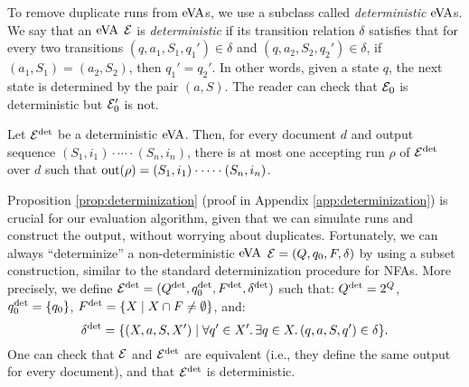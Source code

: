 To remove duplicate runs from $\mathrm{eVA}$s, we use a subclass called
\emph{deterministic} $\mathrm{eVA}$s. We say that an $\mathrm{eVA}$ $\mathcal{E}$ is
\emph{deterministic} if its transition relation $\delta$ satisfies that for
every two transitions $(q, a_1, S_1, q_1') \in \delta$ and $(q, a_2, S_2, q_2')
\in \delta$, if $(a_1, S_1) = (a_2, S_2)$, then $q_1' = q_2'$. In other words,
given a state $q$, the next state is determined by the pair $(a, S)$. The reader
can check that $\mathcal{E}_0$ is deterministic but $\mathcal{E}_0'$ is not. 
\begin{proposition} \label{prop:determinization} Let $\mathcal{E}^{{\operatorname{det}}}$ be a
	deterministic $\mathrm{eVA}$. Then, for every document $d$ and output sequence
	$(S_1, i_1)\cdot \cdots \cdot(S_n, i_n)$, there is at most one accepting run
	$\rho$ of $\mathcal{E}^{{\operatorname{det}}}$ over $d$ such that $\operatorname{out}(\rho) = (S_1, i_1)\cdot
	\cdots \cdot(S_n, i_n)$.
\end{proposition}
Proposition \ref*{prop:determinization} (proof in Appendix
\ref{app:determinization}) is crucial for our evaluation algorithm, given that
we can simulate runs and construct the output, without worrying about
duplicates. Fortunately, we can always ``determinize'' a non-deterministic
$\mathrm{eVA}$ $\mathcal{E} = (Q, q_0, F, \delta)$ by using a subset construction, similar to
the standard determinization procedure for NFAs. More precisely, we define
$\mathcal{E}^{{\operatorname{det}}} = (Q^{{\operatorname{det}}}, q_0^{{\operatorname{det}}}, F^{{\operatorname{det}}}, \delta^{{\operatorname{det}}})$ such that:
$Q^{{\operatorname{det}}} = 2^Q$, $q_0^{{\operatorname{det}}} = \{q_0\}$, $F^{{\operatorname{det}}} = \{X \mid X \cap F \neq
\emptyset\}$, and:
$$
	\delta^{{\operatorname{det}}} = \{(X, a, S, X') \mid \forall q' \in X'. \, \exists q \in X. \, (q, a, S, q') \in \delta\}.
$$
One can check that $\mathcal{E}$ and $\mathcal{E}^{{\operatorname{det}}}$ are equivalent (i.e., they define the
same output for every document), and that $\mathcal{E}^{{\operatorname{det}}}$ is deterministic.

